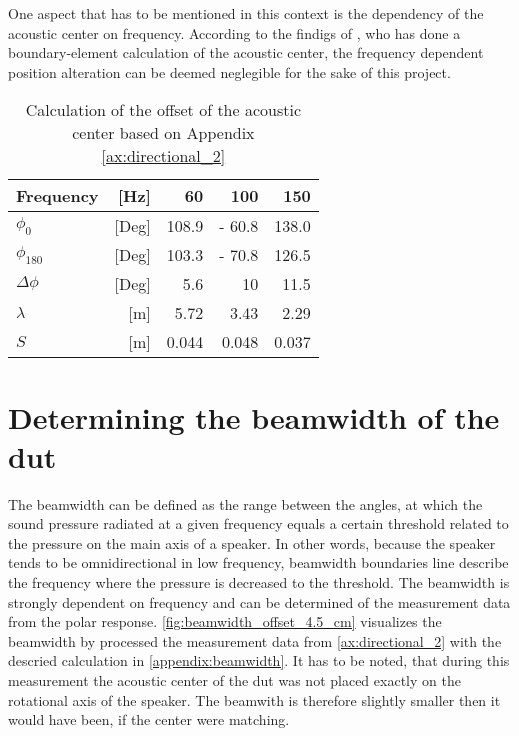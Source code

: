 One aspect that has to be mentioned in this context is the dependency of the acoustic center on frequency. According to the findigs of \citep{vanderkooy10}, who has done a boundary-element calculation of the acoustic center, the frequency dependent position alteration can be deemed  neglegible for the sake of this project.
\begin{table}[H]
\centering
\caption{Calculation of the offset of the acoustic center based on Appendix \ref{ax:directional_2}}
\label{tab:shift_meas2}
\begin{tabular}{|lr|r|r|r|}
\hline
Frequency              & {[}Hz{]}  & 60    & 100    & 150   \\ \hline
\(\phi_0\)             & {[}Deg{]} & 108.9 & - 60.8 & 138.0 \\ \hline
\(\phi_{180}\)         & {[}Deg{]} & 103.3 & - 70.8 & 126.5 \\ \hline
\(\Delta\phi\)         & {[}Deg{]} & 5.6   & 10     & 11.5  \\ \hline
\(\lambda\)            & {[}m{]}   & 5.72  & 3.43   & 2.29  \\ \hline
\(S\)                  & {[}m{]}   & 0.044 & 0.048  & 0.037 \\ \hline
\end{tabular}
\end{table}


\section{Determining the beamwidth of the \gls{dut}}\label{sec:ac_center}
The beamwidth can be defined as the range between the angles, at which the sound pressure radiated at a given frequency equals a certain threshold related to the pressure on the main axis of a speaker. In other words, because the speaker tends to be omnidirectional in low frequency, beamwidth boundaries line describe the frequency where the pressure is decreased to the threshold. The beamwidth is strongly dependent on frequency and can be determined of the measurement data from the polar response. \autoref{fig:beamwidth_offset_4.5_cm} visualizes the beamwidth by processed the measurement data from \ref{ax:directional_2} with the descried calculation in \autoref{appendix:beamwidth}. It has to be noted, that during this measurement the acoustic center of the \gls{dut} was not placed exactly on the rotational axis of the speaker. The beamwith is therefore slightly smaller then it would have been, if the center were matching.

